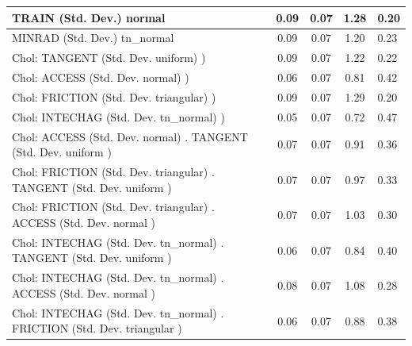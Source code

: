 \begin{table}
\begin{center}
\begin{tabular}{|l|l|c|c|c|l|}
			\hline
			TRAIN (Std. Dev.) normal &  & 0.09 & 0.07 & 1.28 & 0.20 \\
			\hline
			MINRAD (Std. Dev.) tn_normal &  & 0.09 & 0.07 & 1.20 & 0.23 \\
			\hline
			 Chol: TANGENT (Std. Dev. uniform) ) &  & 0.09 & 0.07 & 1.22 & 0.22 \\
			\hline
			 Chol: ACCESS (Std. Dev. normal) ) &  & 0.06 & 0.07 & 0.81 & 0.42 \\
			\hline
			 Chol: FRICTION (Std. Dev. triangular) ) &  & 0.09 & 0.07 & 1.29 & 0.20 \\
			\hline
			 Chol: INTECHAG (Std. Dev. tn_normal) ) &  & 0.05 & 0.07 & 0.72 & 0.47 \\
			\hline
			 Chol: ACCESS (Std. Dev. normal) . TANGENT (Std. Dev.   uniform ) &  & 0.07 & 0.07 & 0.91 & 0.36 \\
			\hline
			 Chol: FRICTION (Std. Dev. triangular) . TANGENT (Std. Dev.   uniform ) &  & 0.07 & 0.07 & 0.97 & 0.33 \\
			\hline
			 Chol: FRICTION (Std. Dev. triangular) . ACCESS (Std. Dev.   normal ) &  & 0.07 & 0.07 & 1.03 & 0.30 \\
			\hline
			 Chol: INTECHAG (Std. Dev. tn_normal) . TANGENT (Std. Dev.   uniform ) &  & 0.06 & 0.07 & 0.84 & 0.40 \\
			\hline
			 Chol: INTECHAG (Std. Dev. tn_normal) . ACCESS (Std. Dev.   normal ) &  & 0.08 & 0.07 & 1.08 & 0.28 \\
			\hline
			 Chol: INTECHAG (Std. Dev. tn_normal) . FRICTION (Std. Dev.   triangular ) &  & 0.06 & 0.07 & 0.88 & 0.38 \\
			\hline
		\end{tabular}
	\end{center}
\end{table}